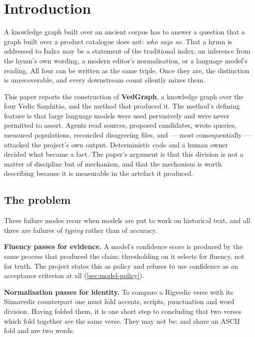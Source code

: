 \section{Introduction}
\label{sec:introduction}

A knowledge graph built over an ancient corpus has to answer a question that a graph
built over a product catalogue does not: \emph{who says so}. That a hymn is addressed
to Indra may be a statement of the traditional index, an inference from the hymn's own
wording, a modern editor's normalisation, or a language model's reading. All four can
be written as the same triple. Once they are, the distinction is unrecoverable, and
every downstream count silently mixes them.

This paper reports the construction of \textbf{VedGraph}, a knowledge graph over the
four Vedic Sa\d{m}hit\=as, and the method that produced it. The method's defining
feature is that large language models were used pervasively and were never permitted
to assert. Agents read sources, proposed candidates, wrote queries, measured
populations, reconciled disagreeing files, and --- most consequentially --- attacked
the project's own output. Deterministic code and a human owner decided what became a
fact. The paper's argument is that this division is not a matter of discipline but of
mechanism, and that the mechanism is worth describing because it is measurable in the
artefact it produced.

\subsection{The problem}

Three failure modes recur when models are put to work on historical text, and all
three are failures of \emph{typing} rather than of accuracy.

\textbf{Fluency passes for evidence.} A model's confidence score is produced by the
same process that produced the claim; thresholding on it selects for fluency, not for
truth. The project states this as policy and refuses to use confidence as an
acceptance criterion at all (\cref{sec:model-policy}).

\textbf{Normalisation passes for identity.} To compare a Rigvedic verse with its
S\=amavedic counterpart one must fold accents, scripts, punctuation and word division.
Having folded them, it is one short step to concluding that two verses which fold
together \emph{are} the same verse. They may not be:  and
 share an \mbox{ASCII} fold and are two words.

